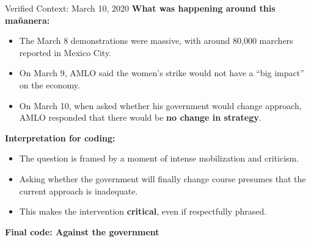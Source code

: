 \documentclass[10pt,aspectratio=169]{beamer}
\begin{document}
\begin{frame}{Verified Context: March 10, 2020}
\small
\textbf{What was happening around this mañanera:}

\begin{itemize}
    \item The March 8 demonstrations were massive, with around 80,000 marchers reported in Mexico City.
    \item On March 9, AMLO said the women's strike would not have a ``big impact'' on the economy.
    \item On March 10, when asked whether his government would change approach, AMLO responded that there would be \textbf{no change in strategy}.
\end{itemize}

\vspace{0.3cm}

\textbf{Interpretation for coding:}

\begin{itemize}
    \item The question is framed by a moment of intense mobilization and criticism.
    \item Asking whether the government will finally change course presumes that the current approach is inadequate.
    \item This makes the intervention \textbf{critical}, even if respectfully phrased.
\end{itemize}

\vspace{0.2cm}

\centering
\textbf{\Large Final code: \alert{Against the government}}
\end{frame}
\end{document}
